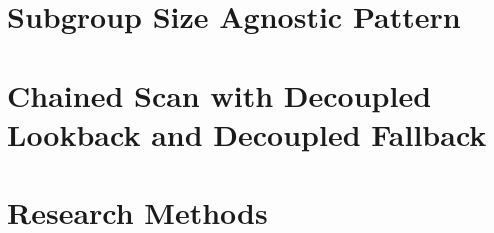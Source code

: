 \documentclass[sigconf]{acmart}
\begin{document}
\section{Subgroup Size Agnostic Pattern}

\section{Chained Scan with Decoupled Lookback and Decoupled Fallback}
\begin{acks}
\end{acks}




\appendix

\section{Research Methods}
\end{document}
